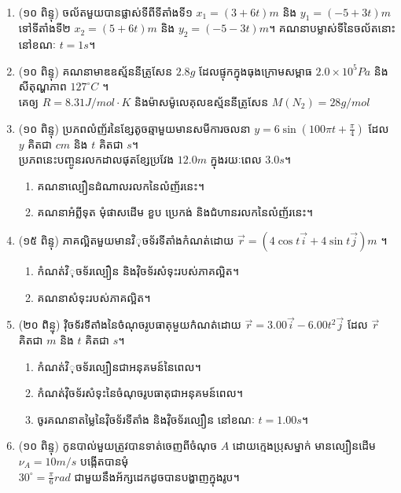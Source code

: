 \documentclass{officialexam}
\begin{document}
	\maketitle\\
	\begin{enumerate}[I]
		\item (១០ ពិន្ទុ) ចល័តមួយបានផ្លាស់ទីពីទីតាំងទី១ $x_1=\left(3+6t\right)m$ និង $y_1=\left(-5+3t\right)m$ ទៅទីតាំងទី២ $x_2=\left(5+6t\right)m$ និង $y_2=\left(-5-3t\right)m$។
		គណនាបម្លាស់ទីនៃចល័តនោះនៅខណៈ $t=1s$។
		\item (១០ ពិន្ទុ) គណនាមាឌឧស្ម័ននីត្រូសែន $2.8g$ ដែលផ្ទុកក្នុងធុងក្រោមសម្ពាធ $2.0\times10^{5}Pa$ និងសីតុណ្ហភាព $127^\circ C$ ។ \\គេឲ្យ $R=8.31J/mol\cdot K$ និងម៉ាសម៉ូលេគុលឧស្ម័ននីត្រូសែន $M(N_2)=28g/mol$
		\item (១០ ពិន្ទុ) ប្រភពលំញ័រនៃខ្សែតូចឆ្មាមួយមានសមីការចលនា $y=6\sin\left(100\pi t+ \frac{\pi}{4}\right)$ ដែល $y$ គិតជា $cm$ និង $t$ គិតជា $s$។\\ ប្រភពនេះបញ្ចូនរលកដាលផុតខ្សែប្រវែង $12.0m$ ក្នុងរយៈពេល $3.0s$។
		\begin{enumerate}[k]
			\item គណនាល្បឿនដំណាលរលកនៃលំញ័រនេះ។
			\item គណនាអំព្លីទុត មុំផាសដើម ខួប ប្រេកង់ និងជំហានរលកនៃលំញ័រនេះ។
		\end{enumerate}
		\item (១៥ ពិន្ទុ) ភាគល្អិតមួយមានវិុចទ័រទីតាំងកំណត់ដោយ $\vec{r}=\left(4\cos t\vec{i}+4\sin t\vec{j}\right)m$ ។
		\begin{enumerate}[k]
			\item កំណត់វិុចទ័រល្បឿន និងវុិចទ័រសំទុះរបស់ភាគល្អិត។
			\item គណនាសំទុះរបស់ភាគល្អិត។
		\end{enumerate}
		\item (២០ ពិន្ទុ) វុិចទ័រទីតាំងនៃចំណុចរូបធាតុមួយកំណត់ដោយ $\vec{r}=3.00\vec{i}-6.00t^2\vec{j}$ ដែល $\vec{r}$ គិតជា $m$ និង $t$ គិតជា $s$។
		\begin{enumerate}[k]
			\item កំណត់វិុចទ័រល្បឿនជាអនុគមន៍នៃពេល។
			\item កំណត់វុិចទ័រសំទុះនៃចំណុចរូបធាតុជាអនុគមន៍ពេល។
			\item ចូរគណនាតម្លៃនៃវុិចទ័រទីតាំង និងវុិចទ័រល្បឿន នៅខណៈ $t=1.00s$។
		\end{enumerate}
		\item (១០ ពិន្ទុ) កូនបាល់មួយត្រូវបានទាត់ចេញពីចំណុច $A$ ដោយក្មេងប្រុសម្នាក់ មានល្បឿនដើម $\nu_A=10m/s$ បង្កើតបានមុំ\\ $30^\circ=\frac{\pi}{6}rad$ ជាមួយនឹងអ័ក្សដេកដូចបានបង្ហាញក្នុងរូប។

\end{enumerate}
\end{document}
